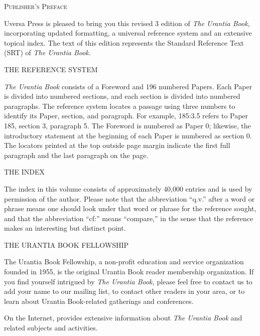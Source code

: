 \newcommand{\preftitle}[1]{\begin{center}#1\end{center}\vspace*{-1ex}}

\begin{center}
\Large\textsc{Publisher's Preface}
\end{center}

Uversa Press is pleased to bring you this revised 3 edition of \emph{The Urantia Book,} incorporating updated formatting, a universal reference system and an extensive topical index. The text of this edition represents the Standard Reference Text (SRT) of \emph{The Urantia Book.}

\preftitle{THE REFERENCE SYSTEM}

\emph{The Urantia Book} consists of a Foreword and 196 numbered Papers.
Each Paper is divided into numbered sections, and each section is divided into numbered paragraphs.
The reference system locates a passage using three numbers to identify its Paper, section, and paragraph.
For example, 185:3.5 refers to Paper 185, section 3, paragraph 5.
The Foreword is numbered as Paper 0; likewise, the introductory statement at the beginning of each Paper is numbered as section 0.
The locators printed at the top outside page margin indicate the first full paragraph and the last paragraph on the page.

\preftitle{THE INDEX}

The index in this volume consists of approximately 40,000 entries and is used by permission of the author.
Please note that the abbreviation “q.v.” after a word or phrase means one should look under that word or phrase for the reference sought, and that the abbreviation “cf:” means “compare,” in the sense that the reference makes an interesting but distinct point.

\preftitle{THE URANTIA BOOK FELLOWSHIP}

The Urantia Book Fellowship, a non-profit education and service organization founded in 1955, is the original Urantia Book reader membership organization.
If you find yourself intrigued by \emph{The Urantia Book,} please feel free to contact us to add your name to our mailing list, to contact other readers in your area, or to learn about Urantia Book-related gatherings and conferences.

On the Internet,  provides extensive information about \emph{The Urantia Book} and related subjects and activities.

